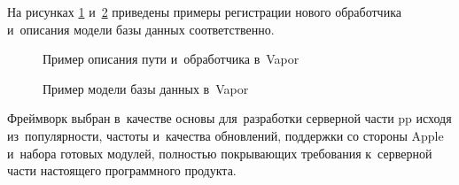 На рисунках \ref{sec:development:arch:pp:vapor:code:route} и~\ref{sec:development:arch:pp:vapor:code:db} приведены примеры регистрации нового обработчика и~описания модели базы данных соответственно.

\begin{figure}[h]
  
  \caption{Пример описания пути и~обработчика в~Vapor}
  \label{sec:development:arch:pp:vapor:code:route}
\end{figure}

\begin{figure}[h]
	
   \caption{Пример модели базы данных в~Vapor}
   \label{sec:development:arch:pp:vapor:code:db}
\end{figure}

Фреймворк выбран в~качестве основы для~разработки серверной части \gls{pp} исходя из~популярности, частоты и~качества обновлений, поддержки со стороны Apple и~набора готовых модулей, полностью покрывающих требования к~серверной части настоящего программного продукта.